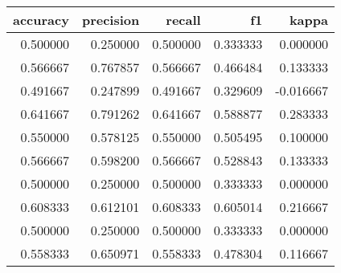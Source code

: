\begin{tabular}{rrrrr}
\toprule
accuracy & precision & recall & f1 & kappa \\
\midrule
0.500000 & 0.250000 & 0.500000 & 0.333333 & 0.000000 \\
0.566667 & 0.767857 & 0.566667 & 0.466484 & 0.133333 \\
0.491667 & 0.247899 & 0.491667 & 0.329609 & -0.016667 \\
0.641667 & 0.791262 & 0.641667 & 0.588877 & 0.283333 \\
0.550000 & 0.578125 & 0.550000 & 0.505495 & 0.100000 \\
0.566667 & 0.598200 & 0.566667 & 0.528843 & 0.133333 \\
0.500000 & 0.250000 & 0.500000 & 0.333333 & 0.000000 \\
0.608333 & 0.612101 & 0.608333 & 0.605014 & 0.216667 \\
0.500000 & 0.250000 & 0.500000 & 0.333333 & 0.000000 \\
0.558333 & 0.650971 & 0.558333 & 0.478304 & 0.116667 \\
\bottomrule
\end{tabular}
